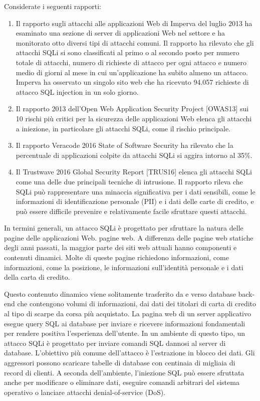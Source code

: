 \singlespacing

Considerate i seguenti rapporti:

\begin{enumerate}
    \item Il rapporto sugli attacchi alle applicazioni Web di Imperva del luglio 2013 ha esaminato una sezione di server di applicazioni Web nel settore e ha monitorato otto diversi tipi di attacchi comuni. Il rapporto ha rilevato che gli attacchi SQLi si sono classificati al primo o al secondo posto per numero totale di attacchi, numero di richieste di attacco per ogni attacco e numero medio di giorni al mese in cui un'applicazione ha subito almeno un attacco. Imperva ha osservato un singolo sito web che ha ricevuto 94.057 richieste di attacco SQL injection in un solo giorno.
    
    \item Il rapporto 2013 dell'Open Web Application Security Project [OWAS13] sui 10 rischi più critici per la sicurezza delle applicazioni Web elenca gli attacchi a iniezione, in particolare gli attacchi SQLi, come il rischio principale.
    
    \item  Il rapporto Veracode 2016 State of Software Security ha rilevato che la percentuale di applicazioni colpite da attacchi SQLi si aggira intorno al 35\%.
    
    \item Il Trustwave 2016 Global Security Report [TRUS16] elenca gli attacchi SQLi come una delle due principali tecniche di intrusione. Il rapporto rileva che SQLi può rappresentare una minaccia significativa per i dati sensibili, come le informazioni di identificazione personale (PII) e i dati delle carte di credito, e può essere difficile prevenire e relativamente facile sfruttare questi attacchi.
\end{enumerate}
In termini generali, un attacco SQLi è progettato per sfruttare la natura delle pagine delle applicazioni Web.
pagine web. A differenza delle pagine web statiche degli anni passati, la maggior parte dei siti web attuali hanno componenti e contenuti dinamici. Molte di queste pagine richiedono informazioni, come informazioni, come la posizione, le informazioni sull'identità personale e i dati della carta di credito. 

\singlespacing

Questo contenuto dinamico viene solitamente trasferito da e verso database back-end che contengono volumi di informazioni, dai dati dei titolari di carta di credito al tipo di scarpe da corsa più acquistato. La pagina web di un server applicativo esegue query SQL ai database per inviare e ricevere informazioni fondamentali per rendere positiva l'esperienza dell'utente. In un ambiente di questo tipo, un attacco SQLi è progettato per inviare comandi SQL dannosi al server di database. L'obiettivo più comune dell'attacco è l'estrazione in blocco dei dati. Gli aggressori possono scaricare tabelle di database con centinaia di migliaia di record di clienti. A seconda dell'ambiente, l'iniezione SQL può essere sfruttata anche per modificare o eliminare dati, eseguire comandi arbitrari del sistema operativo o lanciare attacchi denial-of-service (DoS). 
